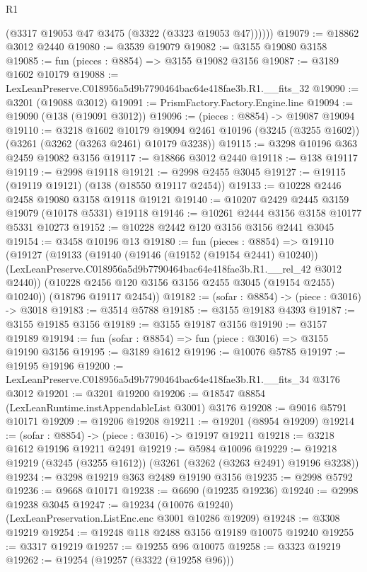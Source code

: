\begin{lexlean}{R1}
\begin{coremodule}
          (@3317 @19053 @47 @3475 (@3322 (@3323 @19053 @47))))))
@19079 := @18862 @3012 @2440
@19080 := @3539 @19079
@19082 := @3155 @19080 @3158
@19085 := fun (pieces : @8854) => @3155 @19082 @3156
@19087 := @3189 @1602 @10179
@19088 := LexLeanPreserve.C018956a5d9b7790464bac64e418fae3b.R1.__fits_32
@19090 := @3201 (@19088 @3012)
@19091 := PrismFactory.Factory.Engine.line
@19094 := @19090 (@138 (@19091 @3012))
@19096 := (pieces : @8854) -> @19087 @19094
@19110 := @3218
    @1602
    @10179
    @19094
    @2461
    @10196
    (@3245 (@3255 @1602))
    (@3261 (@3262 (@3263 @2461) @10179 @3238))
@19115 := @3298 @10196 @363 @2459 @19082 @3156
@19117 := @18866 @3012 @2440
@19118 := @138 @19117
@19119 := @2998 @19118
@19121 := @2998 @2455 @3045
@19127 := @19115 (@19119 @19121) (@138 (@18550 @19117 @2454))
@19133 := @10228 @2446 @2458 @19080 @3158 @19118 @19121
@19140 := @10207 @2429 @2445 @3159 @19079 (@10178 @5331) @19118
@19146 := @10261 @2444 @3156 @3158 @10177 @5331 @10273
@19152 := @10228 @2442 @120 @3156 @3156 @2441 @3045
@19154 := @3458 @10196 @13
@19180 := fun (pieces : @8854) =>
  @19110
    (@19127
      (@19133
        (@19140
          (@19146 (@19152 (@19154 @2441) @10240))
          (LexLeanPreserve.C018956a5d9b7790464bac64e418fae3b.R1.__rel_42 @3012 @2440))
        (@10228 @2456 @120 @3156 @3156 @2455 @3045 (@19154 @2455) @10240))
      (@18796 @19117 @2454))
@19182 := (sofar : @8854) -> (piece : @3016) -> @3018
@19183 := @3514 @5788
@19185 := @3155 @19183 @4393
@19187 := @3155 @19185 @3156
@19189 := @3155 @19187 @3156
@19190 := @3157 @19189
@19194 := fun (sofar : @8854) => fun (piece : @3016) => @3155 @19190 @3156
@19195 := @3189 @1612
@19196 := @10076 @5785
@19197 := @19195 @19196
@19200 := LexLeanPreserve.C018956a5d9b7790464bac64e418fae3b.R1.__fits_34 @3176 @3012
@19201 := @3201 @19200
@19206 := @18547 @8854 (LexLeanRuntime.instAppendableList @3001) @3176
@19208 := @9016 @5791 @10171
@19209 := @19206 @19208
@19211 := @19201 (@8954 @19209)
@19214 := (sofar : @8854) -> (piece : @3016) -> @19197 @19211
@19218 := @3218 @1612 @19196 @19211 @2491
@19219 := @5984 @10096
@19229 := @19218 @19219 (@3245 (@3255 @1612)) (@3261 (@3262 (@3263 @2491) @19196 @3238))
@19234 := @3298 @19219 @363 @2489 @19190 @3156
@19235 := @2998 @5792
@19236 := @9668 @10171
@19238 := @6690 (@19235 @19236)
@19240 := @2998 @19238 @3045
@19247 := @19234 (@10076 @19240) (LexLeanPreservation.ListEnc.enc @3001 @10286 @19209)
@19248 := @3308 @19219
@19254 := @19248 @118 @2488 @3156 @19189 @10075 @19240
@19255 := @3317 @19219
@19257 := @19255 @96 @10075
@19258 := @3323 @19219
@19262 := @19254 (@19257 (@3322 (@19258 @96)))

\end{coremodule}
\end{lexlean}
